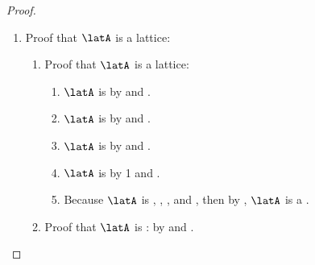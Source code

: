 \begin{proof}
\begin{enumerate}
\begin{enumerate}
      \item Proof that $(xy)z=x(yz)$: 
        \begin{align*}
          (xy)z
            &= \brs{(Q+x)(Q+y)}(Q+z)
            && \text{by \pref{item:s1951_meetas_Qx}}
          \\&= (Q+xy)(Q+z)
            && \text{by \prope{disjunctive distributive} property \xref{item:s1951_joind}}
          \\&= Q+(xy)z
            && \text{by \prope{disjunctive distributive} property \xref{item:s1951_joind}}
          \\&= Q+P
            && \text{by definition of $P$ \xref{item:s1951_meetas_PQ}}
          \\&= P+Q
            && \text{by \prope{join commutative} property \xref{item:s1951_joinc}}
          \\&= P+x(yz)
            && \text{by definition of $Q$ \xref{item:s1951_meetas_PQ}}
          \\&= (P+x)(P+yz)
            && \text{by \prope{disjunctive distributive} property \xref{item:s1951_joind}}
          \\&= (P+x)\brs{(P+y)(P+z)}
            && \text{by \prope{disjunctive distributive} property \xref{item:s1951_joind}}
          \\&= x(yz)
            && \text{by \pref{item:s1951_meetas_Px}}
        \end{align*}
    \end{enumerate}


  \item Proof that $\latA$ is a  lattice:
    \begin{enumerate}
      \item Proof that $\latA$ is a lattice:
        \begin{enumerate}
          \item $\latA$ is   by  and .
          \item $\latA$ is  by  and .
          \item $\latA$ is  by  and .
          \item $\latA$ is   by 1 and .
          \item Because $\latA$ is 
                , , , and ,
                then by , $\latA$ is a .
        \end{enumerate}

      \item Proof that $\latA$ is : 
            by  and .
    \end{enumerate}
\end{enumerate}
\end{proof}




